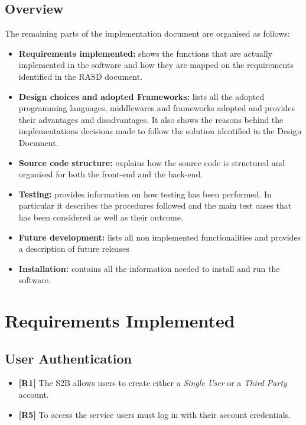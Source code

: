 \documentclass[titlepage]{article}
\begin{document}
	\subsection{Overview}
	The remaining parts of the implementation document are organised as follows:
	\begin{itemize}
		\item {\bf Requirements implemented:}
		shows the functions that are actually implemented in the software and how they are mapped on the requirements identified in the RASD document.
		
		\item {\bf Design choices and adopted Frameworks:}
		lists all the adopted programming languages, middlewares and frameworks adopted and provides their advantages and disadvantages. It also shows the reasons behind the implementations decisions made to follow the solution identified in the Design Document.
		
		\item {\bf Source code structure:}
		explains how the source code is structured and organised for both the front-end and the back-end.
		
		\item {\bf Testing:}
		provides information on how testing has been performed. In particular it describes the procedures followed and the main test cases that has been considered as well as their outcome.
		
		\item{\bf Future development:}
		lists all non implemented functionalities and provides a description of future releases
		
		\item {\bf Installation:}
		contains all the information needed to install and run the software.
	\end{itemize}
	
	
	\pagebreak
	\section{Requirements Implemented}
	
	
	\subsection{User Authentication}
	\begin{itemize}
		\item {\bf [R1]} The S2B allows users to create either a {\it Single User} or a {\it Third Party} account. 
		\item {\bf [R5]} To access the service users must log in with their account credentials.
	\end{itemize}
	
\end{document}
